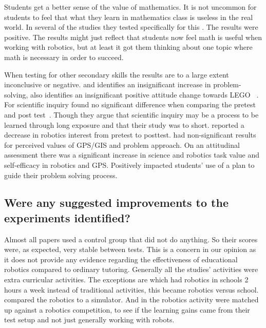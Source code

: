 \bigskip\noindent
Students get a better sense of the value of mathematics. It is not uncommon for students to feel that what they learn in mathematics class is useless in the real world. In several of the studies they tested specifically for this \cite{silk2011resources, nugent2009use}. The results were positive. The results might just reflect that students now feel math is useful when working with robotics, but at least it got them thinking about one topic where math is necessary in order to succeed. 

\bigskip\noindent
When testing for other secondary skills the results are to a large extent inconclusive or negative. 
\citeauthor{hussain2006effect} and \citeauthor{lindh2007does} identifies an insignificant increase  in problem-solving, \citeauthor{hussain2006effect} also identifies an insignificant positive attitude change towards LEGO ~\cite{hussain2006effect,lindh2007does}. 
For scientific inquiry \citeauthor{williams2007acquisition} found no significant difference when comparing the pretest and post test~\cite{williams2007acquisition}. 
Though they argue that scientific inquiry may be a process to be learned through long exposure and that their study was to short.
 reported a decrease in robotics interest from pretest to posttest. 
 had non-significant results for perceived values of GPS/GIS and problem approach. On an attitudinal assessment there was a significant increase in science and robotics task value and self-efficacy in robotics and GPS. 
 Positively impacted students' use of a plan to guide their problem solving process.

\subsection*{Were any suggested improvements to the experiments identified?}
Almost all papers used a control group that did not do anything. So their scores were, as expected, very stable between tests. 
This is a concern in our opinion as it does not provide any evidence regarding the effectiveness of educational robotics compared to ordinary tutoring. 
Generally all the studies' activities were extra curricular activities. The exceptions are  which had robotics in schools 2 hours a week instead of traditional activities, this became robotics versus school.  compared the robotics to a simulator. And in  the robotics activity were matched up against a robotics competition, to see if the learning gains came from their test setup and not just generally working with robots. 

